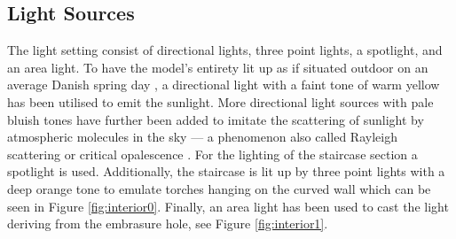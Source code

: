 \subsection{Light Sources}
The light setting consist of directional lights, three point lights, a spotlight, and an area light. To have the model’s entirety lit up as if situated outdoor on an average Danish spring day \cite{DMI}, a directional light with a faint tone of warm yellow has been utilised to emit the sunlight. More directional light sources with pale bluish tones have further been added to imitate the scattering of sunlight by atmospheric molecules in the sky --- a phenomenon also called Rayleigh scattering or critical opalescence \cite{DOE} \cite{Renn2005}. For the lighting of the staircase section a spotlight is used. Additionally, the staircase is lit up by three point lights with a deep orange tone to emulate torches hanging on the curved wall which can be seen in Figure \ref{fig:interior0}. Finally, an area light has been used to cast the light deriving from the embrasure hole, see Figure \ref{fig:interior1}.

